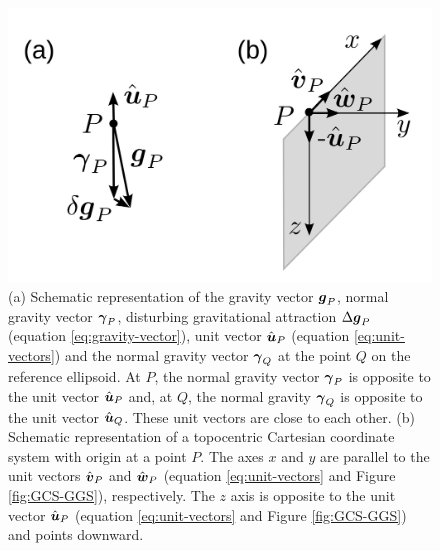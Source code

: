 \documentclass[extra]{gji}
\begin{document}
\begin{figure}
    \includegraphics{figures/local-system.png}
    \caption{(a) Schematic representation of the gravity vector
    $\mitbf{g}_{P}$, normal gravity vector $\mitbf{\gamma}_{P}$,
    disturbing gravitational attraction $\Delta \mitbf{g}_{P}$
    (equation \ref{eq:gravity-vector}), unit vector 
    $\hat{\mitbf{u}}_{P}$ (equation \ref{eq:unit-vectors}) and
    the normal gravity vector $\mitbf{\gamma}_{Q}$ at the point $Q$ on the reference ellipsoid.
    At $P$, the normal gravity vector $\mitbf{\gamma}_{P}$ 
    is opposite to the unit vector $\hat{\mitbf{u}}_{P}$ and, at $Q$, the normal gravity $\mitbf{\gamma}_{Q}$ is opposite
    to the unit vector $\hat{\mitbf{u}}_{Q}$. These unit vectors are
    close to each other.
    (b) Schematic representation of a topocentric Cartesian 
    coordinate system with origin at a point $P$. The axes $x$
    and $y$ are parallel to the unit vectors $\hat{\mitbf{v}}_{P}$
    and $\hat{\mitbf{w}}_{P}$ (equation \ref{eq:unit-vectors} and
    Figure \ref{fig:GCS-GGS}), respectively. The $z$ axis is opposite
    to the unit vector $\hat{\mitbf{u}}_{P}$ (equation 
    \ref{eq:unit-vectors} and Figure \ref{fig:GCS-GGS}) and points downward.}
  \label{fig:TCS}
\end{figure}

\label{lastpage}
\end{document}
